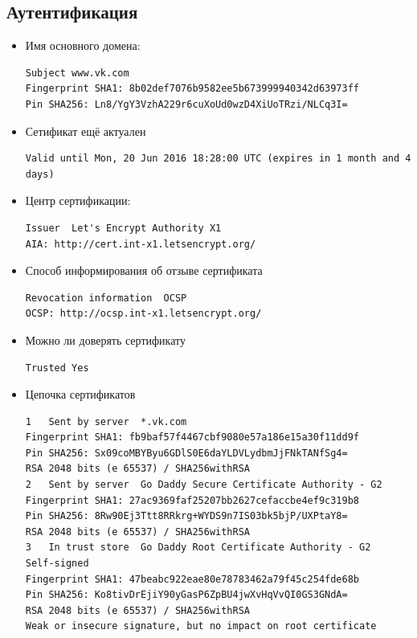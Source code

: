 \subsection{Аутентификация}
\begin{itemize}
	\item Имя основного домена:
	\begin{lstlisting}
Subject	www.vk.com 
Fingerprint SHA1: 8b02def7076b9582ee5b673999940342d63973ff
Pin SHA256: Ln8/YgY3VzhA229r6cuXoUd0wzD4XiUoTRzi/NLCq3I=
	\end{lstlisting}
	
	\item Сетификат ещё актуален
	\begin{lstlisting}
Valid until	Mon, 20 Jun 2016 18:28:00 UTC (expires in 1 month and 4 days)
	\end{lstlisting}
	
	\item Центр сертификации:
	\begin{lstlisting}
Issuer	Let's Encrypt Authority X1 
AIA: http://cert.int-x1.letsencrypt.org/
	\end{lstlisting}
	
	\item Способ информирования об отзыве сертификата
	\begin{lstlisting}
Revocation information	OCSP 
OCSP: http://ocsp.int-x1.letsencrypt.org/ 
	\end{lstlisting}
	
	\item Можно ли доверять сертификату
	\begin{lstlisting}
Trusted	Yes
	\end{lstlisting}
	
	\item Цепочка сертификатов
	\begin{lstlisting}
1	Sent by server	*.vk.com 
Fingerprint SHA1: fb9baf57f4467cbf9080e57a186e15a30f11dd9f
Pin SHA256: Sx09coMBYByu6GDlS0E6daYLDVLydbmJjFNkTANfSg4= 
RSA 2048 bits (e 65537)	/ SHA256withRSA
2	Sent by server	Go Daddy Secure Certificate Authority - G2 
Fingerprint SHA1: 27ac9369faf25207bb2627cefaccbe4ef9c319b8
Pin SHA256: 8Rw90Ej3Ttt8RRkrg+WYDS9n7IS03bk5bjP/UXPtaY8= 
RSA 2048 bits (e 65537)	/ SHA256withRSA
3	In trust store	Go Daddy Root Certificate Authority - G2   Self-signed	
Fingerprint SHA1: 47beabc922eae80e78783462a79f45c254fde68b
Pin SHA256: Ko8tivDrEjiY90yGasP6ZpBU4jwXvHqVvQI0GS3GNdA= 
RSA 2048 bits (e 65537)	/ SHA256withRSA 
Weak or insecure signature, but no impact on root certificate
	\end{lstlisting}
	

\end{itemize}
